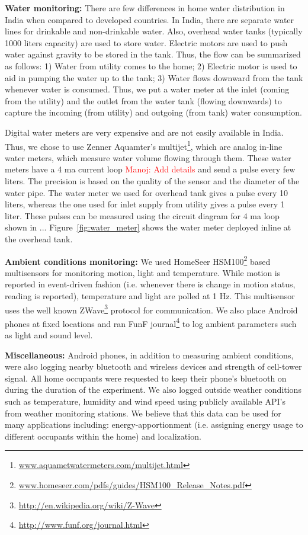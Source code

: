 \documentclass[10pt]{sensys-proc}
\newcommand{\redcolor}[1]{\textcolor{red}{#1}}
\newcommand{\figref}[1]{Figure~\ref{#1}}
\begin{document}
\noindent \textbf{Water monitoring:} There are few differences in home water distribution in India when compared to developed countries. In India, there are separate water lines for drinkable and non-drinkable water. Also, overhead water tanks (typically 1000 liters capacity) are used to store water. Electric motors are used to push water against gravity to be stored in the tank. Thus, the flow can be summarized as follows: 1) Water from utility comes to the home; 2) Electric motor is used to aid in pumping the water up to the tank; 3) Water flows downward from the tank whenever water is consumed. Thus, we put a water meter at the inlet (coming from the utility) and the outlet from the water tank (flowing downwards) to capture the incoming (from utility) and outgoing (from tank) water consumption. 


Digital water meters are very expensive and are not easily available in India. Thus, we chose to use Zenner Aquamter's multijet\footnote{\url{www.aquametwatermeters.com/multijet.html}}, which are analog in-line water meters, which measure water volume flowing through them. These water meters have a 4 ma current loop \redcolor{Manoj: Add details} and send a pulse every few liters. The precision is based on the quality of the sensor and the diameter of the water pipe. The water meter we used for overhead tank gives a pulse every 10 liters, whereas the one used for inlet supply from utility gives a pulse every 1 liter. These pulses can be measured using the circuit diagram for 4 ma loop shown in ... \figref{fig:water_meter} shows the water meter deployed inline at the overhead tank.

\noindent \textbf{Ambient conditions monitoring:} We used HomeSeer HSM100\footnote{\url{www.homeseer.com/pdfs/guides/HSM100_Release_Notes.pdf}} based multisensors for monitoring motion, light and temperature. While motion is reported in event-driven fashion (i.e. whenever there is change in motion status, reading is reported), temperature and light are polled at 1 Hz. This multisensor uses the well known ZWave\footnote{\url{http://en.wikipedia.org/wiki/Z-Wave}} protocol for communication. We also place Android phones at fixed locations and ran FunF journal\footnote{\url{http://www.funf.org/journal.html}} to log ambient parameters such as light and  sound level.

\noindent \textbf{Miscellaneous:} Android phones, in addition to measuring ambient conditions, were also logging nearby bluetooth and wireless devices and strength of cell-tower signal. All home occupants were requested to keep their phone's bluetooth on during the duration of the experiment. We also logged outside weather conditions such as temperature, humidity and wind speed using publicly available API's from weather monitoring stations. We believe that this data can be used for many applications including: energy-apportionment (i.e. assigning energy usage to different occupants within the home) and localization.
\end{document}

